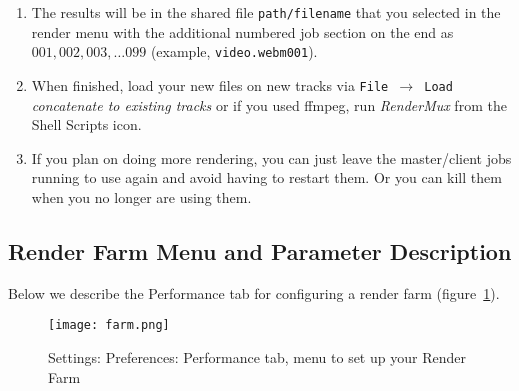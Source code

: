 \begin{enumerate}
{    $\rightarrow$ Render} or \texttt{File $\rightarrow$ Batch Render}
  and check OK.
\item The results will be in the shared file \texttt{path/filename}
  that you selected in the render menu with the additional numbered
  job section on the end as $001, 002, 003, \dots 099$ (example,
  \texttt{video.webm001}).
\item When finished, load your new files on new tracks via
  \texttt{File $\rightarrow$ Load} \textit{concatenate to existing
    tracks} or if you used ffmpeg, run \textit{RenderMux} from the Shell
  Scripts icon.
\item If you plan on doing more rendering, you can just leave the
  master/client jobs running to use again and avoid having to restart
  them.  Or you can kill them when you no longer are using them.
\end{enumerate}

\subsection{Render Farm Menu and Parameter Description}%
\label{sub:render_farm_parameter_description}

Below we describe the Performance tab for configuring a render farm
(figure~\ref{fig:farm}).

\begin{figure}[htpb] \centering
  \texttt{[image: farm.png]}
  \caption{Settings: Preferences: Performance tab, menu
    to set up your Render Farm}
  \label{fig:farm}
\end{figure}

